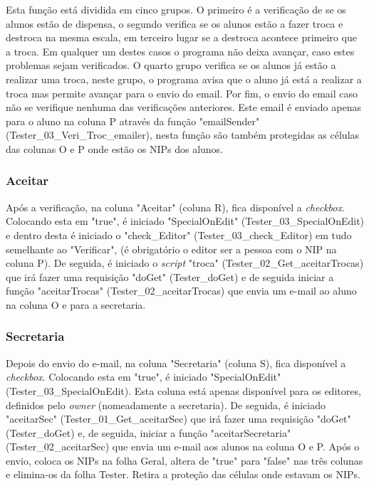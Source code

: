 Esta função está dividida em cinco grupos. O primeiro é a verificação de se os alunos estão de dispensa, o segundo verifica se os alunos estão a fazer troca e destroca na mesma escala, em terceiro lugar se a destroca acontece primeiro que a troca. Em qualquer um destes casos o programa não deixa avançar, caso estes problemas sejam verificados. O quarto grupo verifica se os alunos já estão a realizar uma troca, neste grupo, o programa avisa que o aluno já está a realizar a troca mas permite avançar para o envio do email. Por fim, o envio do email caso não se verifique nenhuma das verificações anteriores. Este email é enviado apenas para o aluno na coluna P através da função "emailSender" (Tester\_03\_Veri\_Troc\_emailer), nesta função são também protegidas as células das colunas O e P onde estão os NIPs dos alunos.

\subsubsection{Aceitar}
Após a verificação, na coluna "Aceitar" (coluna R), fica disponível a \textit{checkbox}. Colocando esta em "true", é iniciado "SpecialOnEdit" (Tester\_03\_SpecialOnEdit) e dentro desta é iniciado o "check\_Editor" (Tester\_03\_check\_Editor) em tudo semelhante ao "Verificar", (é obrigatório o editor ser a pessoa com o NIP na coluna P). De seguida, é iniciado o \textit{script} "troca" (Tester\_02\_Get\_aceitarTrocas) que irá fazer uma requisição "doGet" (Tester\_doGet) e de seguida iniciar a função "aceitarTrocas" (Tester\_02\_aceitarTrocas) que envia um e-mail ao aluno na coluna O e para a secretaria.

\subsubsection{Secretaria}
Depois do envio do e-mail, na coluna "Secretaria" (coluna S), fica disponível a \textit{checkbox}. Colocando esta em "true", é iniciado "SpecialOnEdit" (Tester\_03\_SpecialOnEdit). Esta coluna está apenas disponível para os editores, definidos pelo \textit{owner} (nomeadamente a secretaria). De seguida, é iniciado "aceitarSec" (Tester\_01\_Get\_aceitarSec) que irá fazer uma requisição "doGet" (Tester\_doGet) e, de seguida, iniciar a função "aceitarSecretaria" (Tester\_02\_aceitarSec) que envia um e-mail aos alunos na coluna O e P. Após o envio, coloca os NIPs na folha Geral, altera de "true" para "false" nas três colunas e elimina-os da folha Tester. Retira a proteção das células onde estavam os NIPs.

